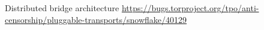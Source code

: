 \documentclass[letterpaper,twocolumn]{article}
\begin{document}

Distributed bridge architecture
\url{https://bugs.torproject.org/tpo/anti-censorship/pluggable-transports/snowflake/40129}

%

%



\end{document}
